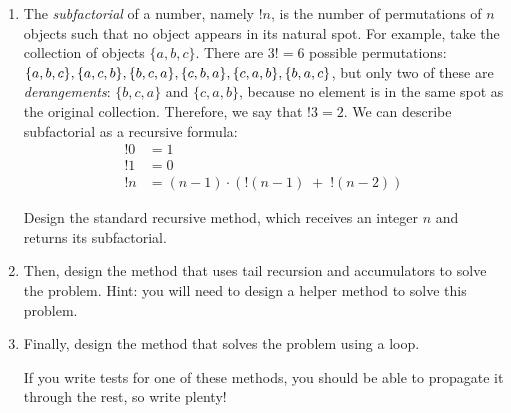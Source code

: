 
\begin{enumerate}[label=(\alph*)]
    \item The \textit{subfactorial} of a number, namely $!n$, is the number of permutations of $n$ objects such that no object appears in its natural spot. For example, take the collection of objects $\{a, b, c\}$. There are $3!=6$ possible permutations: $\{a, b, c\}, \{a, c, b\}, \\\{b, c, a\}, \{c, b, a\}, \{c, a, b\}, \{b, a, c\}$, but only two of these are \textit{derangements}: $\{b, c, a\}$ and $\{c, a, b\}$, because no element is in the same spot as the original collection. Therefore, we say that $!3=2$. We can describe subfactorial as a recursive formula:
\begin{align*}
    !0 &= 1\\
    !1 &= 0\\
    !n &= (n-1) \cdot (!(n - 1)\;+\;!(n - 2))
\end{align*}

    Design the standard recursive  method, which receives an integer $n$ and returns its subfactorial.

    \item Then, design the  method that uses tail recursion and accumulators to solve the problem. Hint: you will need to design a  helper method to solve this problem.

    \item Finally, design the  method that solves the problem using a loop.

    If you write tests for one of these methods, you should be able to propagate it through the rest, so write plenty!
\end{enumerate}

